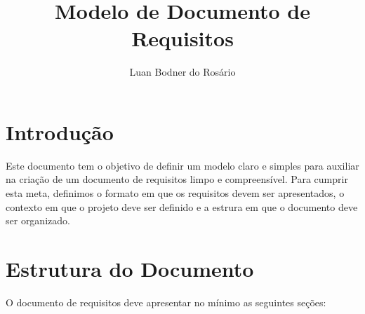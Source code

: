 \documentclass[12pt,a4paper,final]{report}
\author{Luan Bodner do Rosário}
\title{Modelo de Documento de Requisitos}
\begin{document}
\maketitle
\section*{Introdução}

Este documento tem o objetivo de definir um modelo claro e simples para auxiliar na criação de um documento de requisitos limpo e compreensível.
Para cumprir esta meta, definimos o formato em que os requisitos devem ser apresentados, o contexto em que o projeto deve ser definido e a estrura em que o documento deve ser organizado.

\section*{Estrutura do Documento}

O documento de requisitos deve apresentar no mínimo as seguintes seções:
\end{document}
